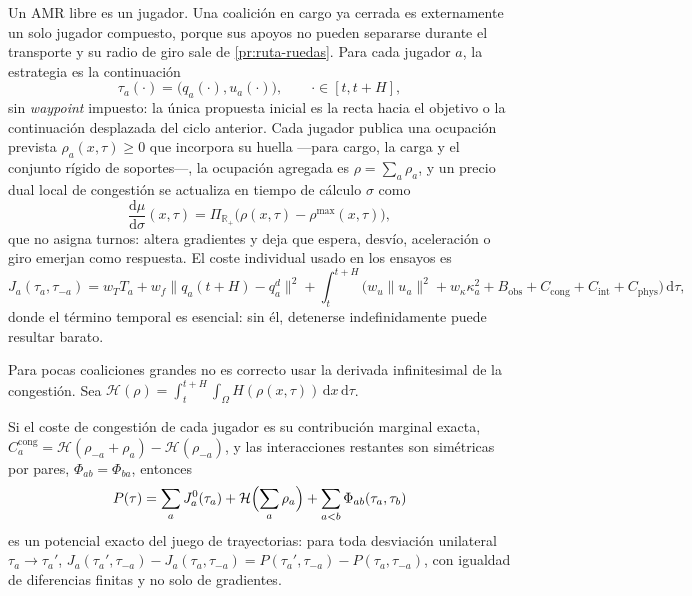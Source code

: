 Un AMR libre es un jugador. Una coalición en \textsf{cargo} ya cerrada es
externamente un solo jugador compuesto, porque sus apoyos no pueden separarse
durante el transporte y su radio de giro sale de \cref{pr:ruta-ruedas}. Para
cada jugador $a$, la estrategia es la continuación
\begin{equation}
  \label{eq:tau-jugador}
  \tau_a(\cdot)=\bigl(q_a(\cdot),u_a(\cdot)\bigr),\qquad \cdot\in[t,t+H],
\end{equation}
sin \emph{waypoint} impuesto: la única propuesta inicial es la recta hacia el
objetivo o la continuación desplazada del ciclo anterior. Cada jugador publica
una ocupación prevista $\rho_a(x,\tau)\ge0$ que incorpora su huella —para
\textsf{cargo}, la carga y el conjunto rígido de soportes—, la ocupación
agregada es $\rho=\sum_a\rho_a$, y un precio dual local de congestión se
actualiza en tiempo de cálculo $\sigma$ como
\begin{equation}
  \label{eq:precio-congestion}
  \frac{\mathrm d\mu}{\mathrm d\sigma}(x,\tau)=\Pi_{\mathbb R_+}\bigl(\rho(x,\tau)-\rho^{\max}(x,\tau)\bigr),
\end{equation}
que no asigna turnos: altera gradientes y deja que espera, desvío, aceleración
o giro emerjan como respuesta. El coste individual usado en los ensayos es
\begin{equation}
  \label{eq:coste-trayectoria}
  J_a(\tau_a,\tau_{-a})=w_TT_a+w_f\lVert q_a(t+H)-q_a^{d}\rVert^2
  +\int_t^{t+H}\bigl(w_u\lVert u_a\rVert^2+w_\kappa\kappa_a^2+B_{\mathrm{obs}}
  +C_{\mathrm{cong}}+C_{\mathrm{int}}+C_{\mathrm{phys}}\bigr)\,\mathrm d\tau ,
\end{equation}
donde el término temporal es esencial: sin él, detenerse indefinidamente puede
resultar barato.

Para pocas coaliciones grandes no es correcto usar la derivada infinitesimal de
la congestión. Sea $\mathcal H(\rho)=\int_t^{t+H}\!\!\int_\Omega
H(\rho(x,\tau))\,\mathrm dx\,\mathrm d\tau$.

\begin{teorema}
\label{th:externalidad-atomica}
Si el coste de congestión de cada jugador es su contribución marginal exacta,
$C_a^{\mathrm{cong}}=\mathcal H(\rho_{-a}+\rho_a)-\mathcal H(\rho_{-a})$, y las
interacciones restantes son simétricas por pares, $\Phi_{ab}=\Phi_{ba}$,
entonces
\begin{equation}
  \label{eq:potencial-trayectorias}
  P(\tau)=\sum_a J_a^{0}(\tau_a)+\mathcal H\Bigl(\sum_a\rho_a\Bigr)+\sum_{a<b}\Phi_{ab}(\tau_a,\tau_b)
\end{equation}
es un potencial exacto del juego de trayectorias: para toda desviación
unilateral $\tau_a\to\tau_a'$, $J_a(\tau_a',\tau_{-a})-J_a(\tau_a,\tau_{-a})
=P(\tau_a',\tau_{-a})-P(\tau_a,\tau_{-a})$, con igualdad de diferencias
finitas y no solo de gradientes.
\end{teorema}

